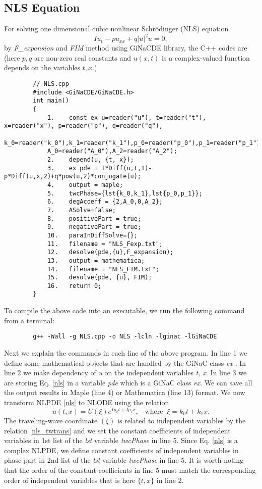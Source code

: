 \documentclass[prd,aps,floats,showkeys,nofootinbib,notitlepage]{revtex4-2}
\begin{document}
	\subsection{NLS Equation}
	For solving one dimensional cubic nonlinear Schrödinger (NLS) equation %
	\begin{equation}\label{nls}
		Iu_t-pu_{xx}+q{|u|}^2u=0,
	\end{equation}
	by {\em F\_expansion} and {\em FIM} method using GiNaCDE library, the C++ codes are (here $p,q$ are non-zero real constants and $u(x,t)$ is a complex-valued function depends on the variables $t,x$.)\\
	\begin{verbatim}
		// NLS.cpp
		#include <GiNaCDE/GiNaCDE.h>
		int main()
		{
			1.    const ex u=reader("u"), t=reader("t"), x=reader("x"), p=reader("p"), q=reader("q"),
			k_0=reader("k_0"),k_1=reader("k_1"),p_0=reader("p_0"),p_1=reader("p_1"), 
			A_0=reader("A_0"),A_2=reader("A_2");   
			2.    depend(u, {t, x});
			3.    ex pde = I*Diff(u,t,1)-p*Diff(u,x,2)+q*pow(u,2)*conjugate(u);
			4.    output = maple;  
			5.    twcPhase={lst{k_0,k_1},lst{p_0,p_1}};
			6.    degAcoeff = {2,A_0,0,A_2};
			7.    ASolve=false;
			8.    positivePart = true; 
			9.    negativePart = true;
			10.   paraInDiffSolve={};
			11.   filename = "NLS_Fexp.txt";
			12.   desolve(pde,{u},F_expansion);
			13.   output = mathematica;
			14.   filename = "NLS_FIM.txt";
			15.   desolve(pde, {u}, FIM);
			16.   return 0;
		}
	\end{verbatim}
	To compile the above code into an executable, we run the following command from a terminal:
	\begin{verbatim}
		g++ -Wall -g NLS.cpp -o NLS -lcln -lginac -lGiNaCDE
	\end{verbatim}
	Next we explain the commands in each line of the above program.
	In line 1 we define some mathematical objects that are handled by the GiNaC class {\em ex} \cite{ginac}. In line 2 we make dependency of {\em u} on the independent variables {\em t, x}. In line 3 we are storing Eq. \eqref{nls} in a variable {\em pde} which is a GiNaC class {\em ex}. We can save all the output results in {Maple} (line 4) or {Mathematica} (line 13) format. We now transform NLPDE \eqref{nls} to NLODE using the relation 
	\begin{equation}\label{nls_twtrans}
		u(t,x)=U(\xi)e^{Ip_0t+Ip_1x},\;\;\;\text{where}\;\;\xi=k_0t+k_1x.
	\end{equation}
	The traveling-wave coordinate $(\xi)$ is related to independent variables by the relation \eqref{nls_twtrans} and we set the constant coefficients of independent variables in 1st list of the {\em lst} variable {\em twcPhase} in line 5. Since Eq. \eqref{nls} is a complex NLPDE, we define constant coefficients of independent variables in phase part in 2nd list of the {\em lst} variable {\em twcPhase} in line 5. It is worth noting that the order of the constant coefficients in line 5 must match the corresponding order of independent variables that is here $\{t,x\}$ in line 2.
\end{document}
